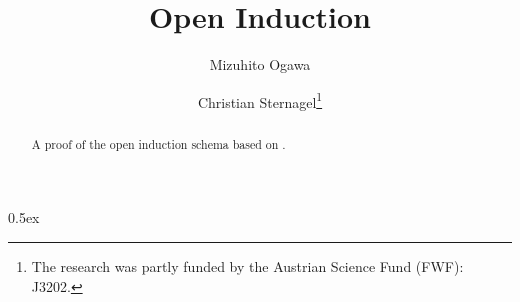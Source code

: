 \documentclass[11pt,a4paper]{article}
\begin{document}
\title{Open Induction}
\author{Mizuhito Ogawa
\and Christian Sternagel\thanks{%
  The research was partly funded by the Austrian Science Fund (FWF): J3202.}}
\maketitle

\begin{abstract}
A proof of the open induction schema based on \cite{Raoult1988}.
\end{abstract}

\tableofcontents


\parindent 0pt\parskip 0.5ex





\end{document}
